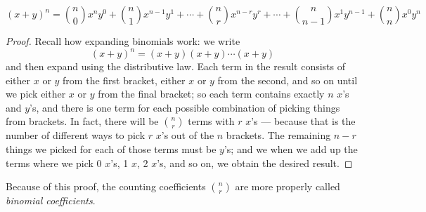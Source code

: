 \begin{thm}
  \begin{displaymath}
    (x + y)^n = \binom{n}{0} x^n y^0 + \binom{n}{1} x^{n - 1} y^1 + \cdots + \binom{n}{r} x^{n - r} y^r + \cdots + \binom{n}{n - 1} x^1 y^{n - 1} + \binom{n}{n} x^0 y^n
  \end{displaymath}
\end{thm}
\begin{proof}
  Recall how expanding binomials work: we write
  \begin{displaymath}
    (x + y)^n = (x + y)(x + y)\cdots(x + y)
  \end{displaymath}
  and then expand using the distributive law. Each term in the result consists of either $ x $ or $ y $ from the first bracket,
  either $ x $ or $ y $ from the second, and so on until we pick either $ x $ or $ y $ from the final bracket; so each term contains
  exactly $ n $ $ x$'s and $ y$'s, and there is one term for each possible combination of picking things from brackets. In fact,
  there will be $ \binom{n}{r} $ terms with $ r $ $ x$'s --- because that is the number of different ways to pick $ r $ $ x$'s out
  of the $ n $ brackets. The remaining $ n - r $ things we picked for each of those terms must be $ y$'s; and we when we add up the
  terms where we pick 0 $ x$'s, 1 $ x $, 2 $ x$'s, and so on, we obtain the desired result.
\end{proof}

Because of this proof, the counting coefficients $ \binom{n}{r} $ are more properly called \emph{binomial coefficients}.

